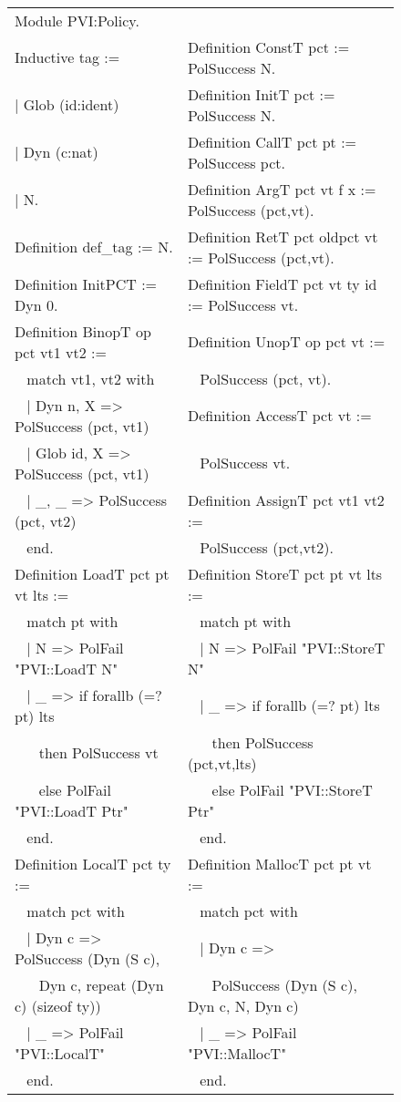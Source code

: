 \documentclass{llncs}
\begin{document}
\begin{figure}[t]

  {\tt \scriptsize
  \begin{tabular}{l l}
    Module PVI:Policy. \\[0.5em]

    Inductive tag := & Definition ConstT pct := PolSuccess N. \\
    | Glob (id:ident) & Definition InitT pct := PolSuccess N. \\
    | Dyn (c:nat) & Definition CallT pct pt := PolSuccess pct. \\
    | N. & Definition ArgT pct vt f x := PolSuccess (pct,vt). \\
    Definition def\_tag := N. & Definition RetT pct oldpct vt := PolSuccess (pct,vt). \\
    Definition InitPCT := Dyn 0. & Definition FieldT pct vt ty id := PolSuccess vt. \\[0.5em]

    Definition BinopT op pct vt1 vt2 :=     & Definition UnopT op pct vt := \\
    ~ match vt1, vt2 with                   & ~ PolSuccess (pct, vt). \\
    ~ | Dyn n, X =>  PolSuccess (pct, vt1)  & Definition AccessT pct vt := \\
    ~ | Glob id, X => PolSuccess (pct, vt1) & ~ PolSuccess vt. \\
    ~ | \_, \_ => PolSuccess (pct, vt2)     & Definition AssignT pct vt1 vt2 := \\
    ~ end.                                  & ~ PolSuccess (pct,vt2). \\[0.5em]

    Definition LoadT pct pt vt lts :=   & Definition StoreT pct pt vt lts := \\
    ~ match pt with                     & ~ match pt with \\
    ~ | N => PolFail "PVI::LoadT N"     & ~ | N => PolFail "PVI::StoreT N" \\
    ~ | \_ => if forallb (=? pt) lts    & ~ | \_ => if forallb (=? pt) lts \\
    ~ ~ then PolSuccess vt              & ~ ~ then PolSuccess (pct,vt,lts) \\
    ~ ~ else PolFail "PVI::LoadT Ptr"   & ~ ~ else PolFail "PVI::StoreT Ptr" \\
    ~ end. & ~ end. \\[0.5em]

    Definition LocalT pct ty :=                &  Definition MallocT pct pt vt :=\\
    ~ match pct with                           & ~ match pct with \\
    ~ | Dyn c => PolSuccess (Dyn (S c),        & ~ | Dyn c => \\
    ~ ~ Dyn c, repeat (Dyn c) (sizeof ty))          & ~ ~ PolSuccess (Dyn (S c), Dyn c, N, Dyn c) \\
    ~ | \_ => PolFail "PVI::LocalT"            & ~ | \_ => PolFail "PVI::MallocT" \\
    ~ end.                                     & ~ end. \\[0.5em]


\end{tabular}}
\end{figure}
\end{document}
